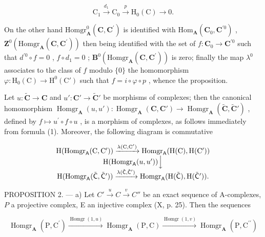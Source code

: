 \[
\mathrm{C} _ {1} \xrightarrow {d _ {1}} \mathrm{C} _ {0} \xrightarrow {p} \mathrm{H} _ {0} (\mathrm{C}) \longrightarrow 0.
\]

On the other hand \(\mathrm{Homgr}_{\mathbf{A}}^{0}(\mathbf{C},\mathbf{C}^{\prime})\) is identified with \(\mathrm{Hom}_{\mathbf{A}}(\mathbf{C}_{0},\mathbf{C}^{\prime 0})\) , \(\mathbf{Z}^{0}(\mathrm{Homgr}_{\mathbf{A}}(\mathbf{C},\mathbf{C}^{\prime}))\) then being identified with the set of \(f:\mathbf{C}_{0}\to \mathbf{C}^{\prime 0}\) such that \(d^{\prime 0}\circ f = 0\) , \(f\circ d_{1} = 0\) ; \(\mathbf{B}^{0}(\mathrm{Homgr}_{\mathbf{A}}(\mathbf{C},\mathbf{C}^{\prime}))\) is zero; finally the map \(\lambda^0\) associates to the class of \(f\) modulo \(\{0\}\) the homomorphism \(\varphi :\mathrm{H}_0(\mathrm{C})\to \mathrm{H}^0 (\mathrm{C}')\) such that \(f = i\circ \varphi \circ p\) , whence the proposition.

Let \(u: \tilde{\mathbf{C}} \to \mathbf{C}\) and \(u': \mathbf{C}' \to \tilde{\mathbf{C}}'\) be morphisms of complexes; then the canonical homomorphism \(\operatorname{Homgr}_{\mathbf{A}}(u, u') : \operatorname{Homgr}_{\mathbf{A}}(\mathbf{C}, \mathbf{C}') \to \operatorname{Homgr}_{\mathbf{A}}(\tilde{\mathbf{C}}, \tilde{\mathbf{C}}')\) , defined by \(f\mapsto u^{\prime}\circ f\circ u\) , is a morphism of complexes, as follows immediately from formula (1). Moreover, the following diagram is commutative

\[
\begin{array}{c} \mathrm{H} (\mathrm{Homgr} _ {\mathsf {A}} (\mathrm{C}, \mathrm{C} ^ {\prime})) \xrightarrow {\lambda (\mathrm{C} , \mathrm{C} ^ {\prime})} \mathrm{Homgr} _ {\mathsf {A}} (\mathrm{H} (\mathrm{C}), \mathrm{H} (\mathrm{C} ^ {\prime})) \\ \mathrm{H} (\mathrm{Homgr} _ {\mathsf {A}} (u, u ^ {\prime})) \Big \downarrow \\ \mathrm{H} (\mathrm{Homgr} _ {\mathsf {A}} (\tilde {\mathsf {C}}, \tilde {\mathsf {C}} ^ {\prime})) \xrightarrow {\lambda (\tilde {\mathsf {C}} , \tilde {\mathsf {C}} ^ {\prime})} \mathrm{Homgr} _ {\mathsf {A}} (\mathrm{H} (\tilde {\mathsf {C}}), \mathrm{H} (\tilde {\mathsf {C}} ^ {\prime}))  . \end{array}
\]

PROPOSITION 2. --- a) Let \(C' \xrightarrow{u} C \xrightarrow{v} C''\) be an exact sequence of A-complexes, \(P\) a projective complex, E an injective complex (X, p. 25). Then the sequences

\[
\operatorname{Homgr} _ {\mathbf {A}} (\mathrm{P}, \mathrm{C} ^ {\prime}) \xrightarrow {\operatorname{Homgr} (1 , u)} \operatorname{Homgr} _ {\mathbf {A}} (\mathrm{P}, \mathrm{C}) \xrightarrow {\operatorname{Homgr} (1 , v)} \operatorname{Homgr} _ {\mathbf {A}} (\mathrm{P}, \mathrm{C} ^ {\prime \prime})
\]

